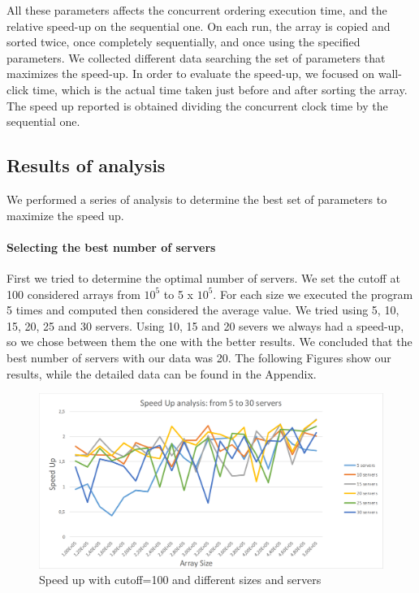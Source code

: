 \documentclass{article}
\begin{document}
	All these parameters affects the concurrent ordering execution time, and the relative speed-up on the sequential one.
	On each run, the array is copied and sorted twice, once completely sequentially, and once using the specified parameters. We collected different data searching the set of parameters that maximizes the speed-up.
	In order to evaluate the speed-up, we focused on wall-click time, which is the actual time taken just before and after sorting the array. The speed up reported is obtained dividing the concurrent clock time by the sequential one.
	
	\subsection{Results of analysis}
	
	We performed a series of analysis to determine the best set of parameters to maximize the speed up.
	
	\paragraph {Selecting the best number of servers} First we tried to determine the optimal number of servers. We set the cutoff at 100 considered arrays from $10^{5}$ to 5 x $10^{5}$. For each size we executed the program 5 times and computed then considered the average value. We tried using 5, 10, 15, 20, 25 and 30 servers.
	Using 10, 15 and 20 severs we always had a speed-up, so we chose between them the one with the better results. We concluded that the best number of servers with our data was 20.
	The following Figures show our results, while the detailed data can be found in the Appendix.
	
	\begin{figure}[!h]
		\centering
		\includegraphics[width=0.8\linewidth]{imgs/SpeedUp5-30servers.png}
		\caption{Speed up with cutoff=100 and different sizes and servers}				
		\label{fig:SU01}
	\end{figure}
\end{document}
